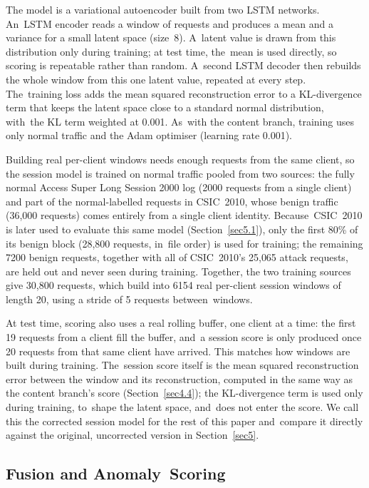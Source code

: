 \documentclass[futureinternet,article,accept,moreauthors]{Definitions/mdpi}
\begin{document}
The model is a variational autoencoder built from two LSTM networks. An~LSTM encoder reads a window of requests and produces a mean and a variance for a small latent space (size~8). A~latent value is drawn from this distribution only during training; at test time, the~mean is used directly, so scoring is repeatable rather than random. A~second LSTM decoder then rebuilds the whole window from this one latent value, repeated at every step. The~training loss adds the mean squared reconstruction error to a KL-divergence term that keeps the latent space close to a standard normal distribution, with~the KL term weighted at 0.001. As~with the content branch, training uses only normal traffic and the Adam optimiser (learning rate 0.001).

Building real per-client windows needs enough requests from the same client, so the session model is trained on normal traffic pooled from two sources: the fully normal Access Super Long Session 2000 log (2000 requests from a single client) and part of the normal-labelled requests in CSIC~2010, whose benign traffic (36{,}000 requests) comes entirely from a single client identity. Because~CSIC~2010 is later used to evaluate this same model (Section~\ref{sec5.1}), only the first 80\% of its benign block (28{,}800 requests, in~file order) is used for training; the remaining 7200 benign requests, together with all of CSIC~2010's 25{,}065 attack requests, are held out and never seen during training. Together, the two training sources give 30{,}800 requests, which build into 6154 real per-client session windows of length 20, using a stride of 5 requests between~windows.

At test time, scoring also uses a real rolling buffer, one client at a time: the first 19 requests from a client fill the buffer, and~a session score is only produced once 20 requests from that same client have arrived. This matches how windows are built during training. The~session score itself is the mean squared reconstruction error between the window and its reconstruction, computed in the same way as the content branch's score (Section~\ref{sec4.4}); the KL-divergence term is used only during training, to~shape the latent space, and~does not enter the score. We call this the corrected session model for the rest of this paper and~compare it directly against the original, uncorrected version in Section~\ref{sec5}.

\subsection{Fusion and Anomaly~Scoring} \label{sec4.6}
\end{document}
